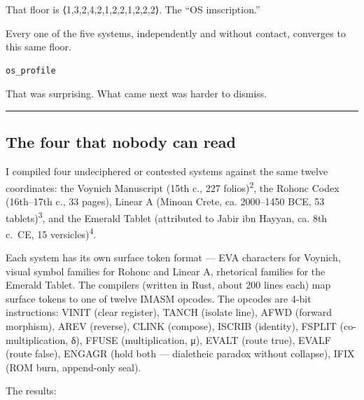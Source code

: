 That floor is ⟨1,3,2,4,2,1,2,2,1,2,2,2⟩. The ``OS imscription.''

Every one of the five systems, independently and without contact,
converges to this same floor.

\begin{verbatim}
os_profile
\end{verbatim}

That was surprising. What came next was harder to dismiss.

\begin{center}\rule{0.5\linewidth}{0.5pt}\end{center}

\hypertarget{the-four-that-nobody-can-read}{%
\subsection{The four that nobody can
read}\label{the-four-that-nobody-can-read}}

I compiled four undeciphered or contested systems against the same
twelve coordinates: the Voynich Manuscript (15th c., 227
folios)\textsuperscript{2}, the Rohonc Codex (16th--17th c., 33 pages),
Linear A (Minoan Crete, ca. 2000--1450 BCE, 53
tablets)\textsuperscript{3}, and the Emerald Tablet (attributed to Jabir
ibn Hayyan, ca. 8th c.~CE, 15 versicles)\textsuperscript{4}.

Each system has its own surface token format --- EVA characters for
Voynich, visual symbol families for Rohonc and Linear A, rhetorical
families for the Emerald Tablet. The compilers (written in Rust, about
200 lines each) map surface tokens to one of twelve IMASM opcodes. The
opcodes are 4-bit instructions: VINIT (clear register), TANCH (isolate
line), AFWD (forward morphism), AREV (reverse), CLINK (compose), ISCRIB
(identity), FSPLIT (co-multiplication, δ), FFUSE (multiplication, μ),
EVALT (route true), EVALF (route false), ENGAGR (hold both ---
dialetheic paradox without collapse), IFIX (ROM burn, append-only seal).

The results:

